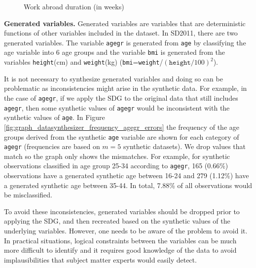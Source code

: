 \documentclass[runningheads]{llncs}
\begin{document}
\begin{figure}[ht!]
    \centering        
    \caption{Work abroad duration (in weeks)}
    \label{fig:graph_datasynthesizer_wkabdur}
\end{figure}

{\bf Generated variables.} Generated variables are variables that are deterministic functions of other variables included in the dataset.  In SD2011, there are two generated variables.  The variable \texttt{agegr} is generated from \texttt{age} by classifying the age variable into 6 age groups and the variable \texttt{bmi} is generated from the variables \texttt{height}(cm) and \texttt{weight}(kg) (\texttt{bmi}=\texttt{weight}/$(\texttt{height}/100)^2$).  

It is not necessary to synthesize generated variables and doing so can be problematic as inconsistencies might arise in the synthetic data.  For example, in the case of \texttt{agegr}, if we apply the SDG to the original data that still includes \texttt{agegr}, then some synthetic values of \texttt{agegr} would be inconsistent with the synthetic values of \texttt{age}. In Figure \ref{fig:graph_datasynthesizer_frequency_agegr_errors} the frequency of the age groups derived from the synthetic \texttt{age} variable are shown for each category of \texttt{agegr} (frequencies are based on $m=5$ synthetic datasets). We drop values that match so the graph only shows the mismatches.  For example, for synthetic observations classified in age group 25-34 according to \texttt{agegr}, 165 (0.66\%) observations have a generated synthetic age between 16-24 and 279 (1.12\%) have a generated synthetic age between 35-44.  In total, 7.88\% of all observations would be misclassified.

To avoid these inconsistencies, generated variables should be dropped prior to applying the SDG, and then recreated based on the synthetic values of the underlying variables. However, one needs to be aware of the problem to avoid it. In practical situations, logical constraints between the variables can be much more difficult to identify and it requires good knowledge of the data to avoid implausibilities that subject matter experts would easily detect. 
\end{document}
